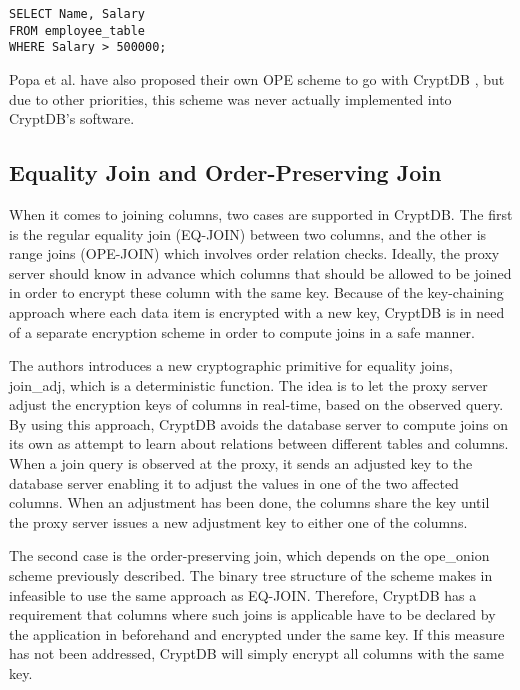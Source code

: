 \begin{verbatim}
SELECT Name, Salary
FROM employee_table
WHERE Salary > 500000;
\end{verbatim}

Popa et al. have also proposed their own OPE scheme to go with CryptDB \cite{CryptDB_OPE_Encoding}, but due to other priorities, this scheme was never actually implemented into CryptDB's software.



\subsection{Equality Join and Order-Preserving Join}

When it comes to joining columns, two cases are supported in CryptDB. The first is the regular equality join (EQ-JOIN) between two columns, and the other is range joins (OPE-JOIN) which involves order relation checks. Ideally, the proxy server should know in advance which columns that should be allowed to be joined in order to encrypt these column with the same key. Because of the key-chaining approach where each data item is encrypted with a new key, CryptDB is in need of a separate encryption scheme in order to compute joins in a safe manner.

The authors \citep{CryptDB_Main_Paper} introduces a new cryptographic primitive for equality joins, \gls{join_adj}, which is a deterministic function. The idea is to let the proxy server adjust the encryption keys of columns in real-time, based on the observed query. By using this approach, CryptDB avoids the database server to compute joins on its own as attempt to learn about relations between different tables and columns. When a join query is observed at the proxy, it sends an adjusted key to the database server enabling it to adjust the values in one of the two affected columns. When an adjustment has been done, the columns share the key until the proxy server issues a new adjustment key to either one of the columns.

The second case is the order-preserving join, which depends on the \gls{ope_onion} scheme previously described. The binary tree structure of the scheme makes in infeasible to use the same approach as EQ-JOIN. Therefore, CryptDB has a requirement that columns where such joins is applicable have to be declared by the application in beforehand and encrypted under the same key. If this measure has not been addressed, CryptDB will simply encrypt all columns with the same key.

